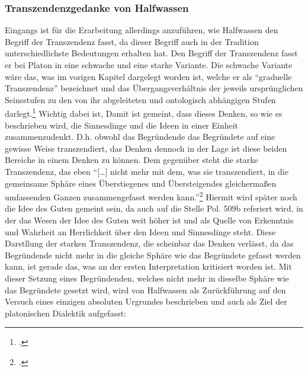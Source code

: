 \subsubsection{Transzendenzgedanke von Halfwassen}
Eingangs ist für die Erarbeitung allerdings anzuführen, wie Halfwassen den Begriff der Transzendenz fasst, da dieser Begriff auch in der Tradition unterschiedlichste Bedeutungen erhalten hat. Den Begriff der Transzendenz fasst er bei Platon in eine schwache und eine starke Variante. Die schwache Variante wäre das, was im vorigen Kapitel dargelegt worden ist, welche er als \enquote{graduelle Transzendenz} bezeichnet und das Übergangsverhältnis der jeweils ursprünglichen Seinsstufen zu den von ihr abgeleiteten und ontologisch abhängigen Stufen darlegt.\footcite[vgl.][S. 29]{halfwassen2015spuren} Wichtig dabei ist,  Damit ist gemeint, dass dieses Denken, so wie es beschrieben wird, die Sinnesdinge und die Ideen in einer Einheit zusammenzudenkt. D.h. obwohl das Begründende das Begründete auf eine gewisse Weise transzendiert, das Denken dennoch in der Lage ist diese beiden Bereiche in einem Denken zu können.
Dem gegenüber steht die starke Transzendenz, das eben \enquote{[\dots] nicht mehr mit dem, was sie transzendiert, in die gemeinsame Sphäre eines Überstiegenes und Übersteigendes gleichermaßen umfassenden Ganzen zusammengefasst werden kann.}\footcite[vgl.][S. 29]{halfwassen2015spuren} Hiermit wird später noch die Idee des Guten gemeint sein, da auch auf die Stelle Pol. 509b referiert wird, in der das Wesen der Idee des Guten weit höher ist und als Quelle von Erkenntnis und Wahrheit an Herrlichkeit über den Ideen und Sinnesdinge steht.
Diese Darstllung der starken Transzendenz, die scheinbar das Denken verlässt, da das Begründende nicht mehr in die gleiche Sphäre wie das Begründete gefasst werden kann, ist gerade das, was an der ersten Interpretation kritisiert worden ist. 
Mit dieser Setzung eines Begründenden, welches nicht mehr in dieselbe Sphäre wie das Begründete gesetzt wird, wird von Halfwassen als Zurückführung auf den Versuch eines einzigen absoluten Urgrundes beschrieben und auch als Ziel der platonischen Dialektik aufgefasst:
